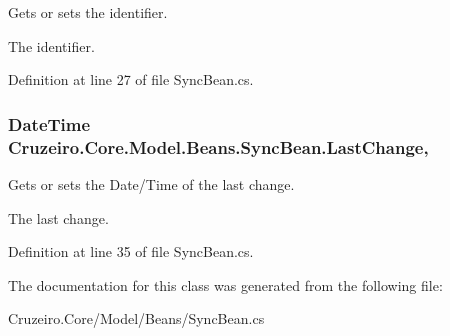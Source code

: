 Gets or sets the identifier. 

The identifier. 

Definition at line 27 of file Sync\+Bean.\+cs.

\subsubsection[{\texorpdfstring{Last\+Change}{LastChange}}]{\setlength{\rightskip}{0pt plus 5cm}Date\+Time Cruzeiro.\+Core.\+Model.\+Beans.\+Sync\+Bean.\+Last\+Change\hspace{0.3cm}{\ttfamily [get]}, {\ttfamily [set]}}\hypertarget{class_cruzeiro_1_1_core_1_1_model_1_1_beans_1_1_sync_bean_afce6edbbdd5121f288c7f3274882e3e6}{}\label{class_cruzeiro_1_1_core_1_1_model_1_1_beans_1_1_sync_bean_afce6edbbdd5121f288c7f3274882e3e6}


Gets or sets the Date/\+Time of the last change. 

The last change. 

Definition at line 35 of file Sync\+Bean.\+cs.



The documentation for this class was generated from the following file\+:\begin{DoxyCompactItemize}
\item 
Cruzeiro.\+Core/\+Model/\+Beans/Sync\+Bean.\+cs\end{DoxyCompactItemize}
